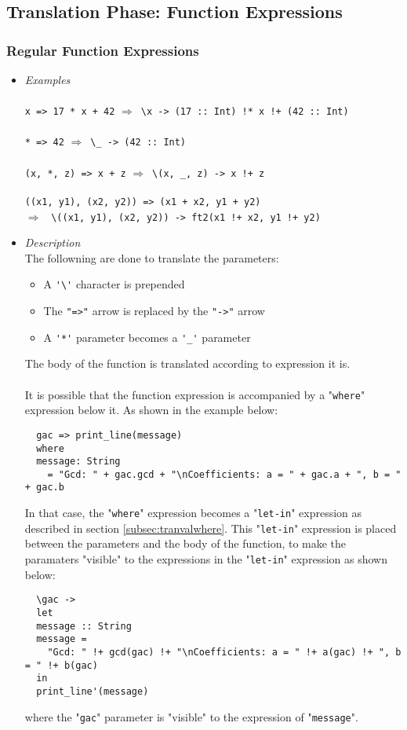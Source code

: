 \documentclass{article}
\def\lra{$\Longrightarrow$\ }
\begin{document}
\newpage
\subsection{Translation Phase: Function Expressions}

\subsubsection{Regular Function Expressions}

\begin{itemize}
\item
\textit{Examples}\\\\
\verb|x => 17 * x + 42| \lra \verb|\x -> (17 :: Int) !* x !+ (42 :: Int)|
\\\\
\verb|* => 42| \lra \verb|\_ -> (42 :: Int)|
\\\\
\verb|(x, *, z) => x + z| \lra \verb|\(x, _, z) -> x !+ z|
\\\\
\verb|((x1, y1), (x2, y2)) => (x1 + x2, y1 + y2)|\\
\lra
\verb|\((x1, y1), (x2, y2)) -> ft2(x1 !+ x2, y1 !+ y2)|\\

\item
\textit{Description}\\

The followning are done to translate the parameters:
\begin{itemize}
\item
A \verb|'\'| character is prepended
\item
The \verb|"=>"| arrow is replaced by the \verb|"->"| arrow
\item
A \verb|'*'| parameter becomes a \verb|'_'| parameter
\end{itemize}
The body of the function is translated according to expression it
is.
\\\\
It is possible that the function expression is accompanied by a
"\texttt{where}" expression below it. As shown in the example below:
\begin{verbatim}
  gac => print_line(message)
  where
  message: String
    = "Gcd: " + gac.gcd + "\nCoefficients: a = " + gac.a + ", b = " + gac.b
\end{verbatim}
In that case, the "\texttt{where}" expression becomes a "\texttt{let-in}"
expression as described in section \ref{subsec:tranvalwhere}. This
"\texttt{let-in}" expression is placed between the parameters and the
body of the function, to make the paramaters "visible" to the expressions
in the "\texttt{let-in}" expression as shown below:
\begin{verbatim}
  \gac ->
  let
  message :: String
  message =
    "Gcd: " !+ gcd(gac) !+ "\nCoefficients: a = " !+ a(gac) !+ ", b = " !+ b(gac)
  in
  print_line'(message)
\end{verbatim}
where the "\verb|gac|" parameter is "visible" to the expression of
"\verb|message|".

\end{itemize}
\end{document}
